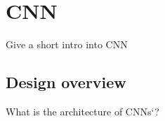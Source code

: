 \chapter{CNN}

Give a short intro into CNN

\section{Design overview}

What is the architecture of CNNs`?

